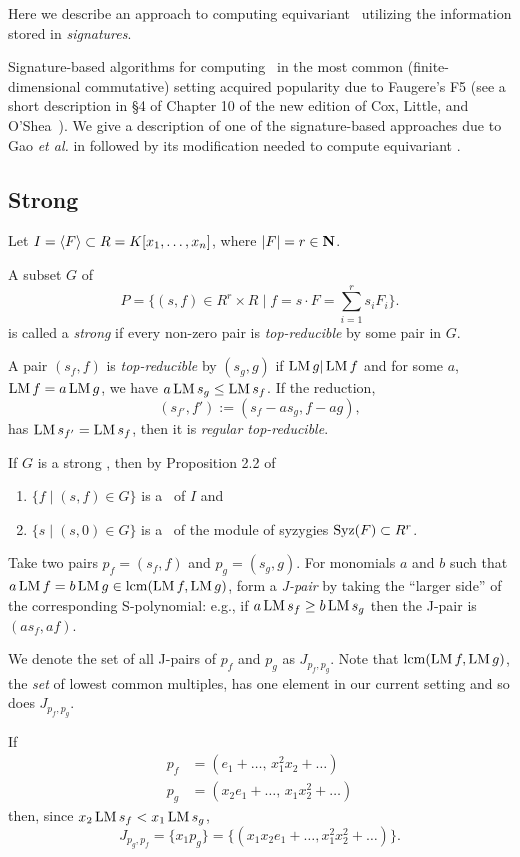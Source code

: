 Here we describe an approach to computing equivariant \GBs\ utilizing the information stored in {\em signatures}. 

Signature-based algorithms for computing \GBs\ in the most common (finite-dimensional commutative) setting acquired popularity due to Faugere's F5 (see a short description in \S 4 of Chapter 10 of the new edition of Cox, Little, and O'Shea~\cite{Cox-Little-OShea:I-V-A}).      
We give a description of one of the signature-based approaches due to Gao {\em et al.} in \cite{Gao-Volny-Wang:signature-GBs} followed by its modification needed to compute equivariant \GBs.  

\subsection{Strong \GB}

Let $I=\langle F \rangle \subset R=K[x_1,\ldots,x_n]$, where $|F|=r\in\mathbf N$.

A subset $G$ of 
\[
P = \{(s,f)\in R^r\times R \mid f=s\cdot F = \sum_{i=1}^r s_iF_i\}.
\]
is called a {\em strong \GB } if every non-zero pair is {\em top-reducible} by some pair in $G$.

A pair $(s_f,f)$ is {\em top-reducible} by $(s_g,g)$ if $\operatorname{LM} g |\operatorname{LM} f$ and 
for some $a$, $\operatorname{LM} f = a \operatorname{LM} g$, we have $a\operatorname{LM} s_g\leq \operatorname{LM} s_f$.  If the reduction,
\[
(s_{f'},f') := (s_f-as_g,f-ag),
\]
has $\operatorname{LM} s_{f'} = \operatorname{LM} s_f$, then it is {\em regular top-reducible}.

If $G$ is a strong \GB, then by Proposition 2.2 of~\cite{Gao-Volny-Wang:signature-GBs}
\begin{enumerate}
   \item $\{f \mid (s,f)\in G\}$ is a \GB\ of $I$ and 
   \item $\{s \mid (s,0)\in G\}$ is a \GB\ of the module of syzygies $\operatorname{Syz}(F) \subset R^r$.
\end{enumerate}
   
Take two pairs $p_f=(s_f,f)$ and $p_g=(s_g,g)$. For monomials $a$ and $b$ such that $a\operatorname{LM} f = b\operatorname{LM} g \in \operatorname{lcm}(\operatorname{LM} f,\operatorname{LM} g)$, form a {\em J-pair} by taking the ``larger side'' of the corresponding S-polynomial: e.g., if $a\operatorname{LM} s_f \geq b\operatorname{LM} s_g$ then the J-pair is $(as_f,af)$.

We denote the set of all J-pairs of $p_f$ and $p_g$ as $J_{p_f,p_g}$. Note that $\operatorname{lcm}(\operatorname{LM} f,\operatorname{LM} g)$, the {\em set} of lowest common multiples, has one element in our current setting and so does $J_{p_f,p_g}$.  

\begin{example} If 
\begin{align*}
p_f &= (e_1+\ldots,\,x_1^2x_2+\ldots)\\
p_g &= (x_2e_1+\ldots,\,x_1x_2^2+\ldots)
\end{align*}
then, since $x_2\operatorname{LM} s_f < x_1\operatorname{LM} s_g$,
\[
J_{p_g,p_f} = \{x_1p_g\} = \{(x_1x_2e_1+\ldots, x_1^2x_2^2+\ldots)\}.
\]
\end{example}

